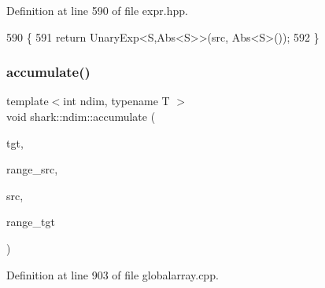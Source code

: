 Definition at line 590 of file expr.\+hpp.


\begin{DoxyCode}
590                                                                                            \{
591             \textcolor{keywordflow}{return} UnaryExp<S,Abs<S>>(src, Abs<S>());
592         \}
\end{DoxyCode}
\hypertarget{namespaceshark_1_1ndim_ac2fdde52862b140ea3d88f43d31425fe}{}\label{namespaceshark_1_1ndim_ac2fdde52862b140ea3d88f43d31425fe} 
\subsubsection{\texorpdfstring{accumulate()}{accumulate()}}
{\footnotesize\ttfamily template$<$int ndim, typename T $>$ \\
void shark\+::ndim\+::accumulate (\begin{DoxyParamCaption}\item[{\hyperlink{classshark_1_1ndim_1_1_global_array}{Global\+Array}$<$ ndim, T $>$ \&}]{tgt,  }\item[{\hyperlink{structshark_1_1ndim_1_1coords__range}{coords\+\_\+range}$<$ ndim $>$}]{range\+\_\+src,  }\item[{\hyperlink{classshark_1_1ndim_1_1_global_array}{Global\+Array}$<$ ndim, T $>$ \&}]{src,  }\item[{\hyperlink{structshark_1_1ndim_1_1coords__range}{coords\+\_\+range}$<$ ndim $>$}]{range\+\_\+tgt }\end{DoxyParamCaption})}



Definition at line 903 of file globalarray.\+cpp.


